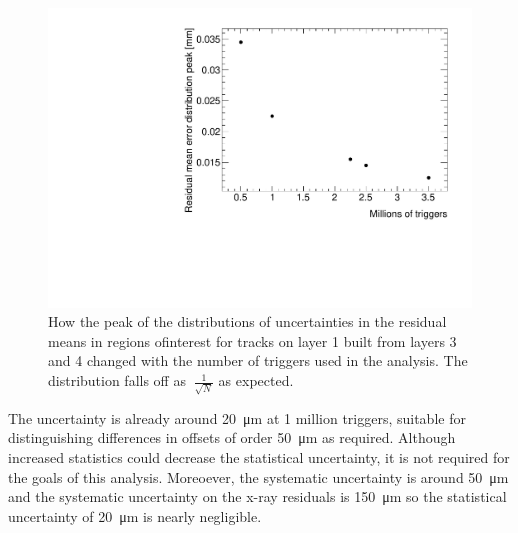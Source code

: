 \begin{figure}
    \centering
    \includegraphics[width = \textwidth]{figures/figure_QS3P18_2900V_peakOfMeanErrorsDistVsTriggers_layer1_fixedlayers34.pdf}
    \caption{How the peak of the distributions of uncertainties in the residual means in regions ofinterest for tracks on layer 1 built from layers 3 and 4 changed with the number of triggers used in the analysis. The distribution falls off as $~\frac{1}{\sqrt{N}}$ as expected.}
    \label{fig:res_mean_uncert_vs_triggers}
\end{figure}

The uncertainty is already around \SI{20}{\micro\meter} at 1 million triggers, suitable for distinguishing differences in offsets of order \SI{50}{\micro\meter} as required. Although increased statistics could decrease the statistical uncertainty, it is not required for the goals of this analysis. Moreoever, the systematic uncertainty is around \SI{50}{\micro\meter} and the systematic uncertainty on the x-ray residuals is \SI{150}{\micro\meter} so the statistical uncertainty of \SI{20}{\micro\meter} is nearly negligible.

